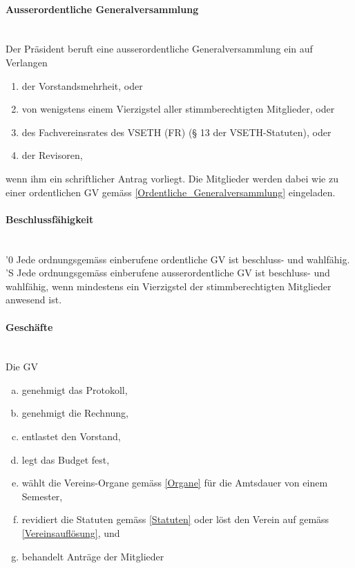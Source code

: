 \documentclass[a4paper,11pt]{article}
\newcommand{\nl}{\\[1.5ex]}
\begin{document}
\paragraph{Ausserordentliche Generalversammlung} \ \\
Der Präsident beruft eine ausserordentliche Generalversammlung ein auf Verlangen
\begin{enumerate}
  \item der Vorstandsmehrheit, oder
  \item von wenigstens einem Vierzigstel aller stimmberechtigten Mitglieder, oder
  \item des Fachvereinsrates des VSETH (FR) (§ 13 der VSETH-Statuten), oder
  \item der Revisoren,
\end{enumerate}
wenn ihm ein schriftlicher Antrag vorliegt. Die Mitglieder werden dabei wie zu einer ordentlichen GV gemäss \ref{Ordentliche_Generalversammlung} eingeladen.


\paragraph{Beschlussfähigkeit} \ \\
'0 Jede ordnungsgemäss einberufene ordentliche GV ist beschluss- und wahlfähig.\nl
'S Jede ordnungsgemäss einberufene ausserordentliche GV ist beschluss- und wahlfähig, wenn mindestens ein Vierzigstel der stimmberechtigten Mitglieder anwesend ist.


\paragraph{Geschäfte} \ \\
Die GV
\begin{enumerate}[(a)]
  \item genehmigt das Protokoll,
  \item genehmigt die Rechnung,
  \item entlastet den Vorstand,
  \item legt das Budget fest,
  \item wählt die Vereins-Organe gemäss \ref{Organe} für die Amtsdauer von einem Semester,
  \item revidiert die Statuten gemäss \ref{Statuten} oder löst den Verein auf gemäss \ref{Vereinsauflösung}, und
  \item behandelt Anträge der Mitglieder
\end{enumerate}
\end{document}
